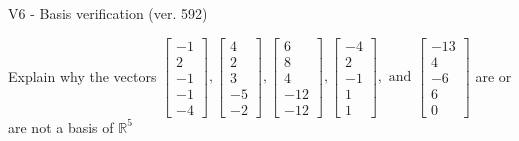 \begin{exercise}
  \begin{exerciseTitle}V6 - Basis verification (ver. 592)\end{exerciseTitle}
  \begin{exerciseStatement}
    Explain why the vectors \(\left[\begin{array}{r}
-1 \\
2 \\
-1 \\
-1 \\
-4
\end{array}\right] , \left[\begin{array}{r}
4 \\
2 \\
3 \\
-5 \\
-2
\end{array}\right] , \left[\begin{array}{r}
6 \\
8 \\
4 \\
-12 \\
-12
\end{array}\right] , \left[\begin{array}{r}
-4 \\
2 \\
-1 \\
1 \\
1
\end{array}\right] , \text{ and } \left[\begin{array}{r}
-13 \\
4 \\
-6 \\
6 \\
0
\end{array}\right]\) are or are not a basis of \(\mathbb{R}^5\)	



\end{exerciseStatement}
\end{exercise}
